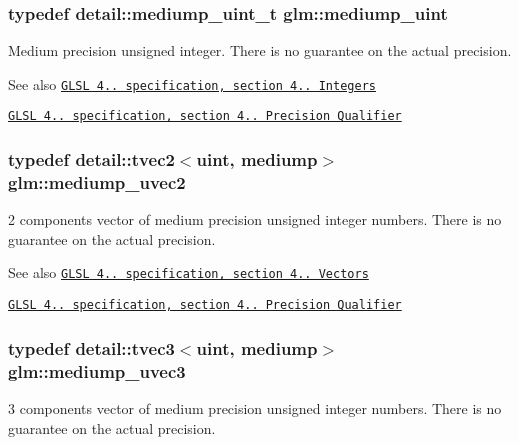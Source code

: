 \subsubsection[{\texorpdfstring{mediump\+\_\+uint}{mediump_uint}}]{\setlength{\rightskip}{0pt plus 5cm}typedef detail\+::mediump\+\_\+uint\+\_\+t {\bf glm\+::mediump\+\_\+uint}}\hypertarget{group__core__precision_ga08ae38ad78ade3539fdd1d25052b8c51}{}\label{group__core__precision_ga08ae38ad78ade3539fdd1d25052b8c51}
Medium precision unsigned integer. There is no guarantee on the actual precision.

\begin{DoxySeeAlso}{See also}
\href{http://www.opengl.org/registry/doc/GLSLangSpec.4.20.8.pdf}{\tt G\+L\+SL 4.. specification, section 4.. Integers} 

\href{http://www.opengl.org/registry/doc/GLSLangSpec.4.20.8.pdf}{\tt G\+L\+SL 4.. specification, section 4.. Precision Qualifier} 
\end{DoxySeeAlso}
\subsubsection[{\texorpdfstring{mediump\+\_\+uvec2}{mediump_uvec2}}]{\setlength{\rightskip}{0pt plus 5cm}typedef detail\+::tvec2$<$uint, mediump$>$ {\bf glm\+::mediump\+\_\+uvec2}}\hypertarget{group__core__precision_ga15c8fb77bdb6763ef73b39e02eb98a56}{}\label{group__core__precision_ga15c8fb77bdb6763ef73b39e02eb98a56}
2 components vector of medium precision unsigned integer numbers. There is no guarantee on the actual precision.

\begin{DoxySeeAlso}{See also}
\href{http://www.opengl.org/registry/doc/GLSLangSpec.4.20.8.pdf}{\tt G\+L\+SL 4.. specification, section 4.. Vectors} 

\href{http://www.opengl.org/registry/doc/GLSLangSpec.4.20.8.pdf}{\tt G\+L\+SL 4.. specification, section 4.. Precision Qualifier} 
\end{DoxySeeAlso}
\subsubsection[{\texorpdfstring{mediump\+\_\+uvec3}{mediump_uvec3}}]{\setlength{\rightskip}{0pt plus 5cm}typedef detail\+::tvec3$<$uint, mediump$>$ {\bf glm\+::mediump\+\_\+uvec3}}\hypertarget{group__core__precision_gaebdefe98b08421ef645f65c706af46b2}{}\label{group__core__precision_gaebdefe98b08421ef645f65c706af46b2}
3 components vector of medium precision unsigned integer numbers. There is no guarantee on the actual precision.

